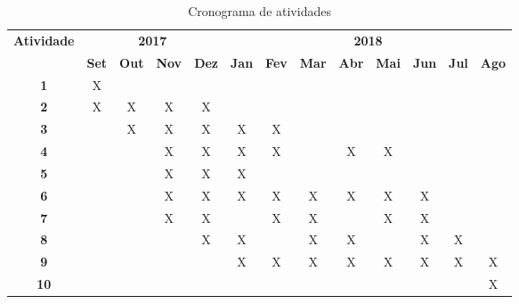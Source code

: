 \begin{table}[h!]
\renewcommand{\arraystretch}{1.3}
\caption{Cronograma de atividades}
\label{tab:cronograma}
\begin{tabular}{|c|c|c|c|c|c|c|c|c|c|c|c|c|}
\hline
\multirow{2}{*}{\textbf{\textbf{Atividade}}} & \multicolumn{4}{c|}{\textbf{2017}}& \multicolumn{8}{c|}{\textbf{2018}} \\ \cline{2-13} 
& \multicolumn{1}{l|}{\textbf{Set}} & \multicolumn{1}{l|}{\textbf{Out}} & \multicolumn{1}{l|}{\textbf{Nov}} & \multicolumn{1}{l|}{\textbf{Dez}} & \multicolumn{1}{l|}{\textbf{Jan}} & \multicolumn{1}{l|}{\textbf{Fev}} & \multicolumn{1}{l|}{\textbf{Mar}} & \multicolumn{1}{l|}{\textbf{Abr}} & \multicolumn{1}{l|}{\textbf{Mai}} & \multicolumn{1}{l|}{\textbf{Jun}} & \multicolumn{1}{l|}{\textbf{Jul}} & \multicolumn{1}{l|}{\textbf{Ago}} \\ \hline
\textbf{1}  & X &   &   &   &   &   &   &   &   &   &   &  \\ \hline
\textbf{2}  & X & X & X & X &   &   &   &   &   &   &   &  \\ \hline
\textbf{3}  &   & X & X & X & X & X &   &   &   &   &   &  \\ \hline
\textbf{4}  &   &   & X & X & X & X &   & X & X &   &   &  \\ \hline
\textbf{5}  &   &   & X & X & X &   &   &   &   &   &   &  \\ \hline
\textbf{6}  &   &   & X & X & X & X & X & X & X & X &   &  \\ \hline
\textbf{7}  &   &   & X & X &   & X & X &   & X & X &   &  \\ \hline
\textbf{8}  &   &   &   & X & X &   & X & X &   & X & X &  \\ \hline
\textbf{9}  &   &   &   &   & X & X & X & X & X & X & X & X \\ \hline
\textbf{10} &   &   &   &   &   &   &   &   &   &   &   & X \\ \hline
\end{tabular}
\end{table}



